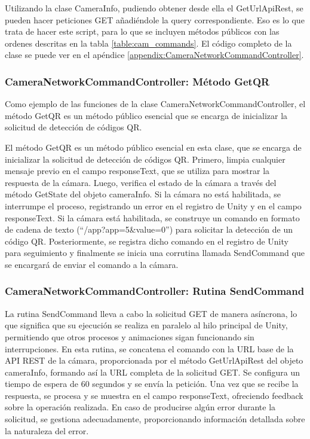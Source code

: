 Utilizando la clase CameraInfo, pudiendo obtener desde ella el GetUrlApiRest, se pueden hacer peticiones GET añadiéndole la query correspondiente. Eso es lo que trata de hacer este script, para lo que se incluyen métodos públicos con las ordenes descritas en la tabla \ref{table:cam_commands}. El código completo de la clase se puede ver en el apéndice \ref{appendix:CameraNetworkCommandController}.

\subsubsection{CameraNetworkCommandController: Método GetQR}

Como ejemplo de las funciones de la clase CameraNetworkCommandController, el método GetQR es un método público esencial que se encarga de inicializar la solicitud de detección de códigos QR.



El método GetQR es un método público esencial en esta clase, que se encarga de inicializar la solicitud de detección de códigos QR. Primero, limpia cualquier mensaje previo en el campo responseText, que se utiliza para mostrar la respuesta de la cámara. Luego, verifica el estado de la cámara a través del método GetState del objeto cameraInfo. Si la cámara no está habilitada, se interrumpe el proceso, registrando un error en el registro de Unity y en el campo responseText. Si la cámara está habilitada, se construye un comando en formato de cadena de texto (``/app?app=5\&value=0'') para solicitar la detección de un código QR. Posteriormente, se registra dicho comando en el registro de Unity para seguimiento y finalmente se inicia una corrutina llamada SendCommand que se encargará de enviar el comando a la cámara.

\subsubsection{CameraNetworkCommandController: Rutina SendCommand}

La rutina SendCommand lleva a cabo la solicitud GET de manera asíncrona, lo que significa que su ejecución se realiza en paralelo al hilo principal de Unity, permitiendo que otros procesos y animaciones sigan funcionando sin interrupciones. En esta rutina, se concatena el comando con la URL base de la API REST de la cámara, proporcionada por el método GetUrlApiRest del objeto cameraInfo, formando así la URL completa de la solicitud GET. Se configura un tiempo de espera de 60 segundos y se envía la petición. Una vez que se recibe la respuesta, se procesa y se muestra en el campo responseText, ofreciendo feedback sobre la operación realizada. En caso de producirse algún error durante la solicitud, se gestiona adecuadamente, proporcionando información detallada sobre la naturaleza del error.



